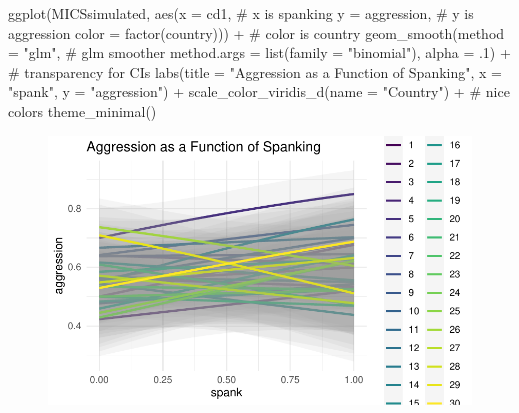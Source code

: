 \documentclass[
  letterpaper,
  DIV=11,
  numbers=noendperiod]{scrreprt}
\newenvironment{Shaded}{\begin{snugshade}}{\end{snugshade}}
\newcommand{\AttributeTok}[1]{\textcolor[rgb]{0.40,0.45,0.13}{#1}}
\newcommand{\CommentTok}[1]{\textcolor[rgb]{0.37,0.37,0.37}{#1}}
\newcommand{\DecValTok}[1]{\textcolor[rgb]{0.68,0.00,0.00}{#1}}
\newcommand{\FunctionTok}[1]{\textcolor[rgb]{0.28,0.35,0.67}{#1}}
\newcommand{\NormalTok}[1]{\textcolor[rgb]{0.00,0.23,0.31}{#1}}
\newcommand{\SpecialCharTok}[1]{\textcolor[rgb]{0.37,0.37,0.37}{#1}}
\newcommand{\StringTok}[1]{\textcolor[rgb]{0.13,0.47,0.30}{#1}}
\begin{document}
\begin{Shaded}
\begin{Highlighting}[]
\FunctionTok{ggplot}\NormalTok{(MICSsimulated,}
       \FunctionTok{aes}\NormalTok{(}\AttributeTok{x =}\NormalTok{ cd1, }\CommentTok{\# x is spanking}
           \AttributeTok{y =}\NormalTok{ aggression, }\CommentTok{\# y is aggression}
           \AttributeTok{color =} \FunctionTok{factor}\NormalTok{(country))) }\SpecialCharTok{+} \CommentTok{\# color is country}
  \FunctionTok{geom\_smooth}\NormalTok{(}\AttributeTok{method =} \StringTok{"glm"}\NormalTok{, }\CommentTok{\# glm smoother}
              \AttributeTok{method.args =} \FunctionTok{list}\NormalTok{(}\AttributeTok{family =} \StringTok{"binomial"}\NormalTok{),}
              \AttributeTok{alpha =}\NormalTok{ .}\DecValTok{1}\NormalTok{) }\SpecialCharTok{+} \CommentTok{\# transparency for CI\textquotesingle{}s}
  \FunctionTok{labs}\NormalTok{(}\AttributeTok{title =} \StringTok{"Aggression as a Function of Spanking"}\NormalTok{,}
       \AttributeTok{x =} \StringTok{"spank"}\NormalTok{,}
       \AttributeTok{y =} \StringTok{"aggression"}\NormalTok{) }\SpecialCharTok{+}
  \FunctionTok{scale\_color\_viridis\_d}\NormalTok{(}\AttributeTok{name =} \StringTok{"Country"}\NormalTok{) }\SpecialCharTok{+} \CommentTok{\# nice colors}
  \FunctionTok{theme\_minimal}\NormalTok{()}
\end{Highlighting}
\end{Shaded}

\begin{figure}[H]

{\centering \includegraphics{simulate-data_files/figure-pdf/unnamed-chunk-6-1.pdf}

}

\end{figure}
\end{document}
